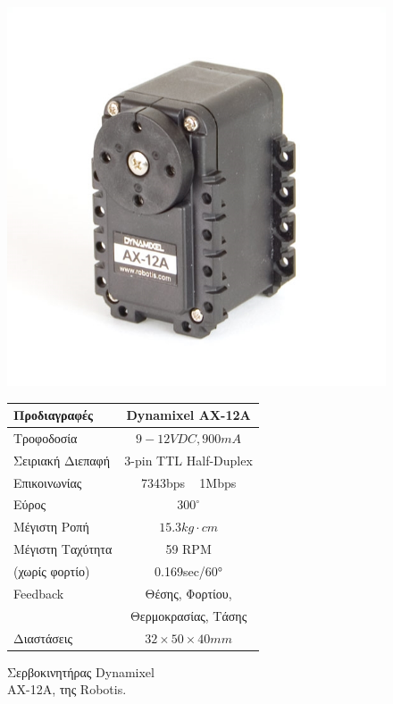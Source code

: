 \begin{figure}[!ht]
	\begin{minipage}[b]{0.45\textwidth}
		\centering
		\includegraphics[width=0.8\linewidth]{Chapters/Chapter2/Figures/dxl_ax_12a.png}
		\caption{Σερβοκινητήρας Dynamixel\\ AX-12A, της Robotis.}
		\label{fig:dxl_ax_12a}
	\end{minipage}		
	\begin{minipage}[b]{0.475\textwidth}
		\centering
		\begin{tabular}{| l | c |}
			\hline
			\textbf{Προδιαγραφές} & \textbf{Dynamixel AX-12A}\\ \hline
			Τροφοδοσία & $9-12VDC, 900mA$\\ \hline
			Σειριακή Διεπαφή& 3-pin TTL Half-Duplex\\
			Επικοινωνίας  & 7343bps ~ 1Mbps\\ \hline
			Εύρος & $300^{\circ}$\\ \hline
			Μέγιστη Ροπή & $15.3 kg \cdot cm$\\ \hline
			Μέγιστη Ταχύτητα & 59 RPM \\ (χωρίς φορτίο) & 0.169sec/60°\\ \hline
			Feedback & Θέσης, Φορτίου,\\& Θερμοκρασίας, Τάσης\\ \hline
			Διαστάσεις & $32 \times 50 \times 40 mm$\\ \hline
		\end{tabular}
		\label{tab:dxl_ax_12a_specs}
	\end{minipage}
\end{figure}


